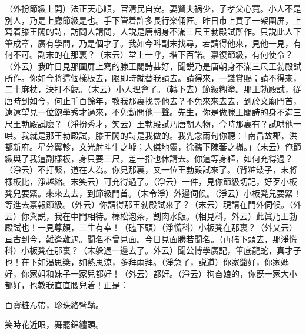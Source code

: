 \begin{myquote}
{\marktext\small（外扮節級上開）}法正天心順，官清民自安。妻賢夫祸少，子孝父心寬。小人不是別人，乃是上廳節級是也。手下管着許多長行楽俑匠。昨日市上買了一架圍屏，上寫着滕王閣的詩，訪問人請問，人説是唐朝身不滿三尺王勃殿試所作。只説此人下筆成章，廣有學問，乃是個才子。我如今呌副末找尋，若請得他來，見他一見，有何不可。副末的在那裏？{\marktext\small（末云）}堂上一呼，堦下百諾。禀復節級，有何使令？{\marktext\small（外云）}我昨日見那圍屏上寫的滕王閣詩甚好，聞説乃是唐朝身不滿三尺王勃殿試所作。你如今將這個樣板去，限即時就替我請去。請得來，一錢賞賜；請不得來，二十麻杖，決打不饒。{\marktext\small（末云）}小人理會了。{\marktext\small（轉下去）}節級糊塗。那王勃殿試，従唐時到如今，何止千百餘年，教我那裏找尋他去？不免來來去去，到於文廟門首，遠遠望見一位飽學秀才過來，不免動問他一聲。先生，你是做滕王閣詩的身不滿三尺王勃殿試麽？{\marktext\small（淨扮秀才，笑云）}王勃殿試乃唐朝人物，今時那裏有？試哄他一哄。我就是那王勃殿試，滕王閣的詩是我做的。我先念兩句你聽：「南昌故郡，洪都新府。星分翼軫，文光射斗牛之墟；人傑地靈，徐孺下陳蕃之榻。」{\marktext\small（末云）}俺節級與了我這副樣板，身只要三尺，差一指也休請去。你這等身軀，如何充得過？{\marktext\small（淨云）}不打緊，道在人為。你見那裏，又一位王勃殿試來了。{\marktext\small（背粧矮子，末將樣板比，淨越縮。末笑云）}可充得過了。{\marktext\small（淨云）}一件，見你節級切記，好歹小板凳兒要緊。來來去去，到節級門首。{\marktext\small（末令淨）}外邊伺候。{\marktext\small（淨云）}小板凳兒要緊！等進去禀報節級。{\marktext\small（外云）}你請得那王勃殿試來了？{\marktext\small（末云）}現請在門外伺候。{\marktext\small（外云）}你與説，我在中門相待。榛松泡茶，割肉水飯。{\marktext\small（相見科，外云）}此眞乃王勃殿試也！一見尊顏，三生有幸！{\marktext\small（磕下頭）（淨慌科）}小板凳在那裏？{\marktext\small（外又云）}亘古到今，難逢難遇。聞名不曾見面。今日見面勝若聞名。{\marktext\small（再磕下頭去，那淨慌科）}小板凳在那裏？{\marktext\small（末躲過一邊去了。外云）}聞公博學廣記，筆底龍蛇，真才子也！在下如渴思槳，如熱思涼，多拜兩拜。{\marktext\small（淨急了，説道）}你家爺好，你家媽好，你家姐和妹子一家兒都好！{\marktext\small（外云）}都好。{\marktext\small（淨云）}狗㒲娘的，你旣一家大小都好，也教我直直腰兒着！正是：

百寳粧ん帶，珍珠絡臂鞲。

笑時花近眼，舞罷錦纏頭。
\end{myquote}

